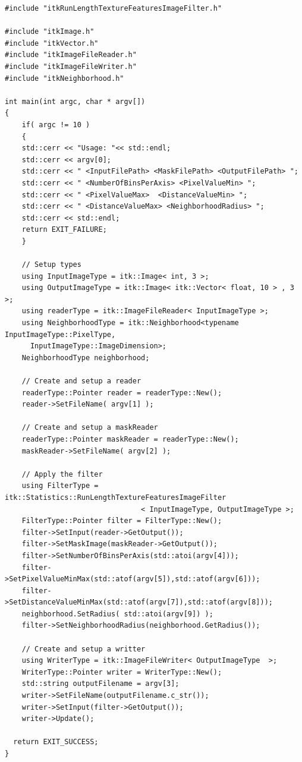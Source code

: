 \documentclass{InsightArticle}
\begin{document}
\begin{verbatim}
#include "itkRunLengthTextureFeaturesImageFilter.h"

#include "itkImage.h"
#include "itkVector.h"
#include "itkImageFileReader.h"
#include "itkImageFileWriter.h"
#include "itkNeighborhood.h"

int main(int argc, char * argv[])
{
    if( argc != 10 )
    {
    std::cerr << "Usage: "<< std::endl;
    std::cerr << argv[0];
    std::cerr << " <InputFilePath> <MaskFilePath> <OutputFilePath> ";
    std::cerr << " <NumberOfBinsPerAxis> <PixelValueMin> ";
    std::cerr << " <PixelValueMax>  <DistanceValueMin> ";
    std::cerr << " <DistanceValueMax> <NeighborhoodRadius> ";
    std::cerr << std::endl;
    return EXIT_FAILURE;
    }

    // Setup types
    using InputImageType = itk::Image< int, 3 >;
    using OutputImageType = itk::Image< itk::Vector< float, 10 > , 3 >;
    using readerType = itk::ImageFileReader< InputImageType >;
    using NeighborhoodType = itk::Neighborhood<typename InputImageType::PixelType,
      InputImageType::ImageDimension>;
    NeighborhoodType neighborhood;

    // Create and setup a reader
    readerType::Pointer reader = readerType::New();
    reader->SetFileName( argv[1] );

    // Create and setup a maskReader
    readerType::Pointer maskReader = readerType::New();
    maskReader->SetFileName( argv[2] );

    // Apply the filter
    using FilterType = itk::Statistics::RunLengthTextureFeaturesImageFilter
                                < InputImageType, OutputImageType >;
    FilterType::Pointer filter = FilterType::New();
    filter->SetInput(reader->GetOutput());
    filter->SetMaskImage(maskReader->GetOutput());
    filter->SetNumberOfBinsPerAxis(std::atoi(argv[4]));
    filter->SetPixelValueMinMax(std::atof(argv[5]),std::atof(argv[6]));
    filter->SetDistanceValueMinMax(std::atof(argv[7]),std::atof(argv[8]));
    neighborhood.SetRadius( std::atoi(argv[9]) );
    filter->SetNeighborhoodRadius(neighborhood.GetRadius());

    // Create and setup a writter
    using WriterType = itk::ImageFileWriter< OutputImageType  >;
    WriterType::Pointer writer = WriterType::New();
    std::string outputFilename = argv[3];
    writer->SetFileName(outputFilename.c_str());
    writer->SetInput(filter->GetOutput());
    writer->Update();

  return EXIT_SUCCESS;
}
\end{verbatim}
\normalsize
\end{document}
